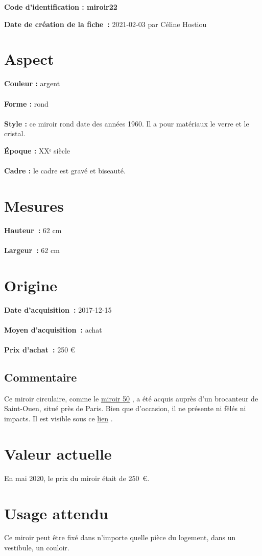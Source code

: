 
     {\bf \huge Code d’identification : miroir22} \\
    \newline \hr \begin{center} 
       
    \end{center} 
    \begin{itemize}
    
    \footnotesize {\item {\bf Date de création de la fiche :} 2021-02-03
    {par Céline Hostiou}} 
    \end{itemize}
   \hr 
    \section* {Aspect} 
    {\bf \large Couleur :} argent
    \\ \\ {\bf \large Forme :} rond 
    \\ \\ {\bf \large Style :} 
            ce miroir rond date des années 1960. Il a pour matériaux le verre et
            le cristal.
         
        {\bf \large Époque :} XXᵉ siècle 
    \\ \\ {\bf \large Cadre :} le cadre est gravé et biseauté.
         
    \section* {Mesures}
     {\bf \large Hauteur :} 62 cm
   \\ \\ {\bf \large Largeur :} 62 cm 
  
    \section* {Origine}
    {\bf \large Date d’acquisition :} 2017-12-15 \\ \\
    {\bf \large Moyen d’acquisition :} achat \\ \\ {\bf \large Prix d’achat :}
        250 € 
      
    \subsection* {Commentaire}
     Ce miroir circulaire, comme le 
    \href{miroir50.xml}{miroir 50}
  ,
                a été acquis auprès d’un brocanteur de Saint-Ouen, situé près de Paris. Bien que
                d’occasion, il ne présente ni fêlés ni impacts. Il est visible sous ce 
    \href{https://www.selency.fr/produit/55V2Q3Y2/miroir-rond-grave-et-biseaute-annees-60.html}{lien}
  . 
    \section* {Valeur actuelle}
    En mai 2020, le prix du miroir était de 250 €.
    \section* {Usage attendu}
     Ce miroir peut être fixé dans n’importe quelle pièce du logement, dans un vestibule, un
            couloir.   
  